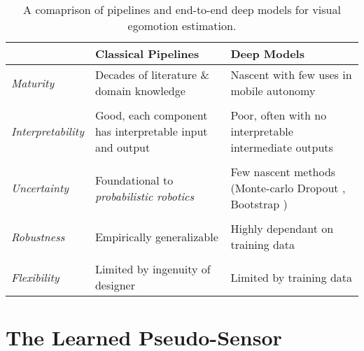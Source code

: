 \begin{table}[h!]
	\caption{A comaprison of pipelines and end-to-end deep models for visual egomotion estimation.}
	\begin{threeparttable}
	\begin{tabular}{m{}m{}m{}}
		\toprule
		& \textbf{Classical Pipelines} & \textbf{Deep Models} \\ \midrule  
		\textit{Maturity} & Decades of literature \& domain knowledge & Nascent with few uses in mobile autonomy \\
		& & \\
		\textit{Interpretability} & Good, each component has interpretable input and output & Poor, often with no interpretable intermediate outputs \\
		& & \\
		\textit{Uncertainty} & Foundational to \textit{probabilistic robotics} & Few nascent methods (Monte-carlo Dropout \citep{Gal2016-ny}, Bootstrap \citep{Osband2016})  \\
		& & \\
		\textit{Robustness} & Empirically generalizable \citep{Zhou2019-se} & Highly dependant on training data\\
		& & \\
		\textit{Flexibility} & Limited by ingenuity of designer & Limited by training data \\
		\bottomrule
	\end{tabular}
\end{threeparttable}
\label{tab:intro_classical_vs_deep}
\end{table}

\section{The Learned Pseudo-Sensor}

